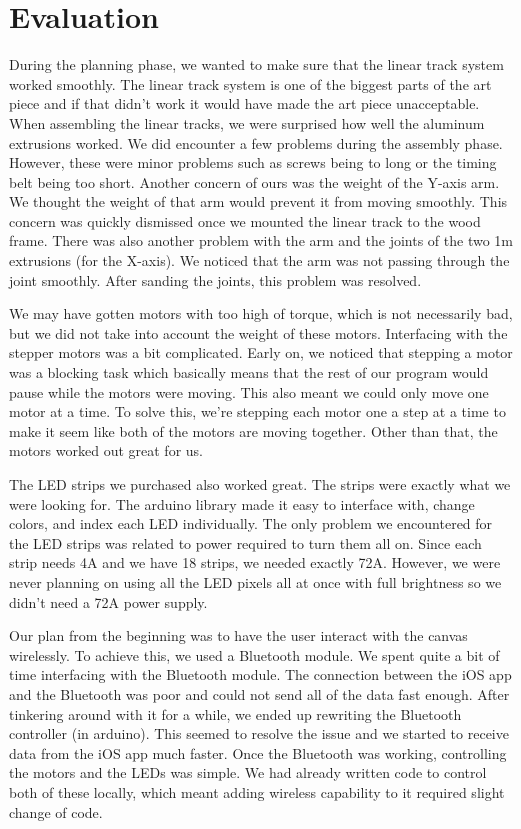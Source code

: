 \documentclass[11pt]{IEEEtran}
\begin{document}
\section{Evaluation}
During the planning phase, we wanted to make sure that the linear track system worked smoothly. The linear track system is one of the biggest parts of the art piece and if that didn’t work it would have made the art piece unacceptable. When assembling the linear tracks, we were surprised how well the aluminum extrusions worked. We did encounter a few problems during the assembly phase. However, these were minor problems such as screws being to long or the timing belt being too short. Another concern of ours was the weight of the Y-axis arm. We thought the weight of that arm would prevent it from moving smoothly. This concern was quickly dismissed once we mounted the linear track to the wood frame. There was also another problem with the arm and the joints of the two 1m extrusions (for the X-axis). We noticed that the arm was not passing through the joint smoothly. After sanding the joints, this problem was resolved. 

We may have gotten motors with too high of torque, which is not necessarily bad, but we did not take into account the weight of these motors. Interfacing with the stepper motors was a bit complicated. Early on, we noticed that stepping a motor was a blocking task which basically means that the rest of our program would pause while the motors were moving. This also meant we could only move one motor at a time. To solve this, we’re stepping each motor one a step at a time to make it seem like both of the motors are moving together. Other than that, the motors worked out great for us.

The LED strips we purchased also worked great. The strips were exactly what we were looking for. The arduino library made it easy to interface with, change colors, and index each LED individually. The only problem we encountered for the LED strips was related to power required to turn them all on. Since each strip needs 4A and we have 18 strips, we needed exactly 72A. However, we were never planning on using all the LED pixels all at once with full brightness so we didn’t need a 72A power supply.

Our plan from the beginning was to have the user interact with the canvas wirelessly. To achieve this, we used a Bluetooth module. We spent quite a bit of time interfacing with the Bluetooth module. The connection between the iOS app and the Bluetooth was poor and could not send all of the data fast enough. After tinkering around with it for a while, we ended up rewriting the Bluetooth controller (in arduino). This seemed to resolve the issue and we started to receive data from the iOS app much faster. Once the Bluetooth was working, controlling the motors and the LEDs was simple. We had already written code to control both of these locally, which meant adding wireless capability to it required slight change of code.
\end{document}
